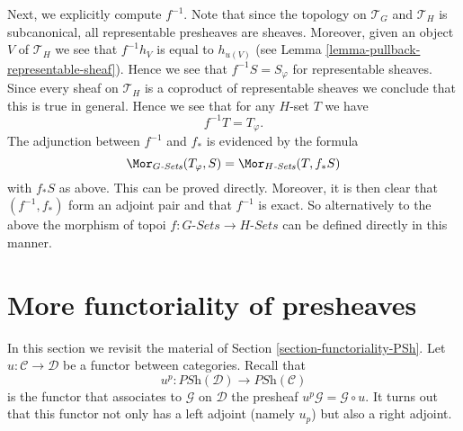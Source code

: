 \medskip\noindent
Next, we explicitly compute $f^{-1}$. Note that since the topology
on $\mathcal{T}_G$ and $\mathcal{T}_H$ is subcanonical, all representable
presheaves are sheaves. Moreover, given an object $V$ of $\mathcal{T}_H$
we see that $f^{-1}h_V$ is equal to $h_{u(V)}$ (see
Lemma \ref{lemma-pullback-representable-sheaf}). Hence we see that
$f^{-1}S = S_\varphi$ for representable sheaves. Since every sheaf on
$\mathcal{T}_H$ is a coproduct of representable sheaves we conclude that
this is true in general. Hence we see that
for any $H$-set $T$ we have
$$
f^{-1}T = T_\varphi.
$$
The adjunction between $f^{-1}$ and $f_*$ is evidenced by the formula
$$
\Mor_{G\textit{-Sets}}(T_\varphi, S) =
\Mor_{H\textit{-Sets}}(T, f_*S)
$$
with $f_*S$ as above. This can be proved directly. Moreover, it is then clear
that $(f^{-1}, f_*)$ form an adjoint pair and that $f^{-1}$ is exact.
So alternatively to the above the morphism of topoi
$f : G\textit{-Sets} \to H\textit{-Sets}$ can be defined directly in this
manner.












\section{More functoriality of presheaves}
\label{section-more-functoriality-PSh}

\noindent
In this section we revisit the material of
Section \ref{section-functoriality-PSh}.
Let $u : \mathcal{C} \to \mathcal{D}$ be a functor between categories.
Recall that
$$
u^p :
\textit{PSh}(\mathcal{D})
\longrightarrow
\textit{PSh}(\mathcal{C})
$$
is the functor that associates to $\mathcal{G}$ on $\mathcal{D}$ the presheaf
$u^p\mathcal{G} = \mathcal{G} \circ u$. It turns out that this functor
not only has a left adjoint (namely $u_p$) but also a right adjoint.


